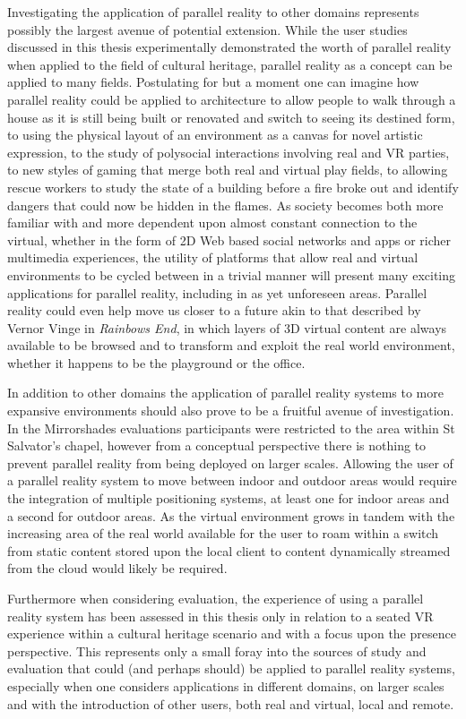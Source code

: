 Investigating the application of parallel reality to other domains represents possibly the largest avenue of potential extension. While the user studies discussed in this thesis experimentally demonstrated the worth of parallel reality when applied to the field of cultural heritage, parallel reality as a concept can be applied to many fields. Postulating for but a moment one can imagine how parallel reality could be applied to architecture to allow people to walk through a house as it is still being built or renovated and switch to seeing its destined form, to using the physical layout of an environment as a canvas for novel artistic expression, to the study of polysocial interactions involving real and VR parties, to new styles of gaming that merge both real and virtual play fields, to allowing rescue workers to study the state of a building before a fire broke out and identify dangers that could now be hidden in the flames. As society becomes both more familiar with and more dependent upon almost constant connection to the virtual, whether in the form of 2D Web based social networks and apps or richer multimedia experiences, the utility of platforms that allow real and virtual environments to be cycled between in a trivial manner will present many exciting applications for parallel reality, including in as yet unforeseen areas. Parallel reality could even help move us closer to a future akin to that described by Vernor Vinge in \textit{Rainbows End}, in which layers of 3D virtual content are always available to be browsed and to transform and exploit the real world environment, whether it happens to be the playground or the office.

In addition to other domains the application of parallel reality systems to more expansive environments should also prove to be a fruitful avenue of investigation. In the Mirrorshades evaluations participants were restricted to the area within St Salvator's chapel, however from a conceptual perspective there is nothing to prevent parallel reality from being deployed on larger scales. Allowing the user of a parallel reality system to move between indoor and outdoor areas would require the integration of multiple positioning systems, at least one for indoor areas and a second for outdoor areas. As the virtual environment grows in tandem with the increasing area of the real world available for the user to roam within a switch from static content stored upon the local client to content dynamically streamed from the cloud would likely be required.

Furthermore when considering evaluation, the experience of using a parallel reality system has been assessed in this thesis only in relation to a seated VR experience within a cultural heritage scenario and with a focus upon the presence perspective. This represents only a small foray into the sources of study and evaluation that could (and perhaps should) be applied to parallel reality systems, especially when one considers applications in different domains, on larger scales and with the introduction of other users, both real and virtual, local and remote.

